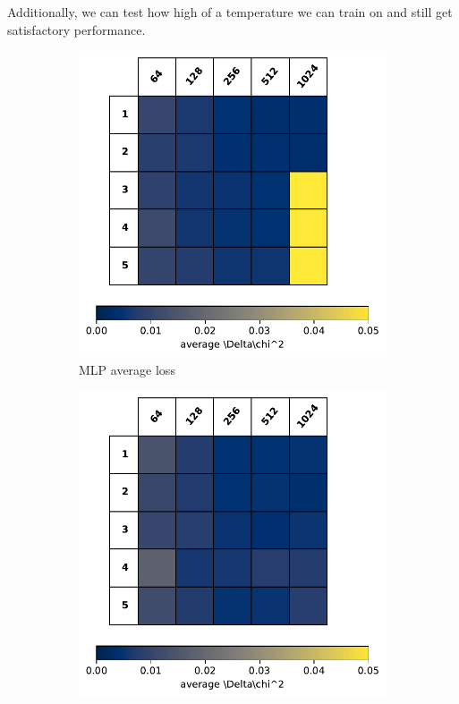 Additionally, we can test how high of a temperature we can train on and still get satisfactory performance.

\begin{figure}[tb]
	\centering
	\begin{subfigure}[b]{0.49\textwidth}
		\includegraphics[width=\textwidth]{plots/model_table_mlp.pdf}
		\caption{MLP average loss}
		\label{fig:mlp_table}
	\end{subfigure}
	\begin{subfigure}[b]{0.49\textwidth}
		\includegraphics[width=\textwidth]{plots/model_table_resnet.pdf}

\end{subfigure}
\end{figure}
